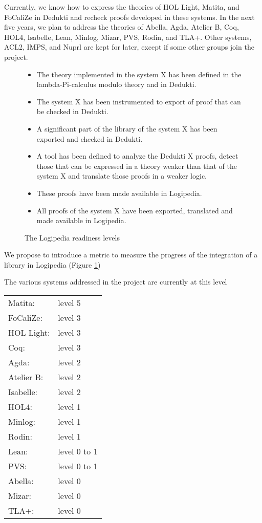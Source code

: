 Currently, we know how to express the theories of {\sc HOL Light},
{\sc Matita}, and {\sc FoCaliZe} in {\sc Dedukti} and recheck proofs
developed in these systems. In the next five years, we plan to address
the theories of {\sc Abella}, {\sc Agda}, {\sc Atelier B}, {\sc Coq},
{\sc HOL4}, {\sc Isabelle}, {\sc Lean}, {\sc Minlog}, {\sc Mizar},
{\sc PVS}, {\sc Rodin}, and {\sc TLA+}. Other systems, {\sc ACL2},
{\sc IMPS}, and {\sc Nuprl} are kept for later, except if some other
groups join the project.

\begin{figure}
\begin{itemize}
\item[Level 1:]
The theory implemented in the system X has been defined in
the lambda-Pi-calculus modulo theory and in Dedukti.

\item[Level 2:]
The system X has been instrumented to export of proof that
can be checked in Dedukti.

\item[Level 3:]
A significant part of the library of the system X has been exported and checked in Dedukti.

\item[Level 4:]
A tool has been defined to analyze the Dedukti X proofs,
detect those that can be expressed in a theory weaker than that of the
system X and translate those proofs in a weaker logic.

\item[Level 5:]
These proofs have been made available in Logipedia.

\item[Level 6:]
All proofs of the system X have been exported, translated
and made available in Logipedia.
\end{itemize}
\caption{The Logipedia readiness levels \label{lrl}}
\end{figure}

We propose to introduce a metric to measure the progress of the
integration of a library in Logipedia (Figure \ref{lrl})

The various systems addressed in the project are currently at this level 

\begin{tabular}{ll}
Matita:& level 5\\
FoCaliZe:& level 3\\
HOL Light:& level 3\\
Coq:& level 3\\
Agda:& level 2\\
Atelier B:& level 2\\
Isabelle:& level 2\\
HOL4:& level 1\\
Minlog:& level 1\\
Rodin:& level 1\\
Lean:& level 0 to 1\\
PVS:& level 0 to 1\\
Abella:& level 0\\
Mizar:& level 0\\
TLA+:& level 0
\end{tabular}

